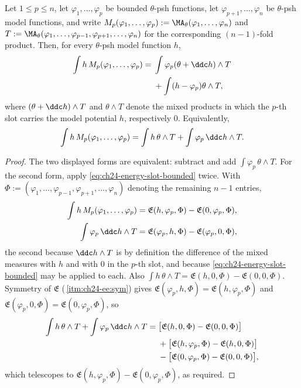 \begin{proposition}
\label{prop:ch24-forced-ibp}
Let \(1\leq p\leq n\), let \(\varphi_1,\ldots,\varphi_p\) be bounded
\(\theta\)-psh functions, let \(\varphi_{p+1},\ldots,\varphi_n\) be
\(\theta\)-psh model functions, and write
\(M_p(\varphi_1,\ldots,\varphi_p):=
\MA_\theta(\varphi_1,\ldots,\varphi_n)\) and
\(T:=\MA_\theta(\varphi_1,\ldots,\varphi_{p-1},
\varphi_{p+1},\ldots,\varphi_n)\) for the corresponding
\((n-1)\)-fold product.  Then, for every \(\theta\)-psh model function
\(h\),
\begin{equation}
\label{eq:inductive-ma-definition}
\begin{split}
 \int h\,M_p(\varphi_1,\ldots,\varphi_p)
 ={}&\int\varphi_p(\theta+\ddc h)\wedge T\\
     &+\int(h-\varphi_p)\theta\wedge T,
\end{split}
\end{equation}
where \((\theta+\ddc h)\wedge T\) and \(\theta\wedge T\) denote the mixed
products in which the \(p\)-th slot carries the model potential \(h\),
respectively \(0\).  Equivalently,
\[
 \int h\,M_p(\varphi_1,\ldots,\varphi_p)
 =\int h\,\theta\wedge T+\int\varphi_p\,\ddc h\wedge T .
\]
\end{proposition}

\begin{proof}
The two displayed forms are equivalent: subtract and add
\(\int\varphi_p\,\theta\wedge T\).  For the second form, apply
\eqref{eq:ch24-energy-slot-bounded} twice.  With
\(\Phi:=(\varphi_1,\ldots,\varphi_{p-1},\varphi_{p+1},\ldots,\varphi_n)\)
denoting the remaining \(n-1\) entries,
\[
 \begin{aligned}
 \int h\,M_p(\varphi_1,\ldots,\varphi_p)
   &=\mathfrak E(h,\varphi_p,\Phi)-\mathfrak E(0,\varphi_p,\Phi),\\
 \int\varphi_p\,\ddc h\wedge T
   &=\mathfrak E(\varphi_p,h,\Phi)-\mathfrak E(\varphi_p,0,\Phi),
 \end{aligned}
\]
the second because \(\ddc h\wedge T\) is by definition the difference of the
mixed measures with \(h\) and with \(0\) in the \(p\)-th slot, and because
\eqref{eq:ch24-energy-slot-bounded} may be applied to each.  Also
\(\int h\,\theta\wedge T=\mathfrak E(h,0,\Phi)-\mathfrak E(0,0,\Phi)\).
Symmetry of \(\mathfrak E\)
(\,\cref{itm:ch24-ee:sym}) gives
\(\mathfrak E(\varphi_p,h,\Phi)=\mathfrak E(h,\varphi_p,\Phi)\) and
\(\mathfrak E(\varphi_p,0,\Phi)=\mathfrak E(0,\varphi_p,\Phi)\), so
  \begin{align*}
 \int h\,\theta\wedge T+\int\varphi_p\,\ddc h\wedge T
 ={}&\bigl[\mathfrak E(h,0,\Phi)-\mathfrak E(0,0,\Phi)\bigr]\\
 &+\bigl[\mathfrak E(h,\varphi_p,\Phi)-\mathfrak E(h,0,\Phi)\bigr]\\
 &-\bigl[\mathfrak E(0,\varphi_p,\Phi)-\mathfrak E(0,0,\Phi)\bigr],
  \end{align*}
which telescopes to
\(\mathfrak E(h,\varphi_p,\Phi)-\mathfrak E(0,\varphi_p,\Phi)\), as
required.
\end{proof}

